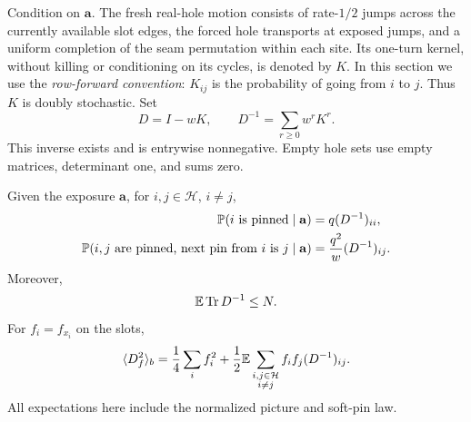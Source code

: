 Condition on $\mathbf a$.  The fresh real-hole motion consists of
rate-$1/2$ jumps across the currently available slot edges, the forced
hole transports at exposed jumps, and a uniform completion of the seam
permutation within each site.  Its one-turn kernel, without killing
or conditioning on its cycles, is denoted by $K$.  In this section we
use the \emph{row-forward convention}: $K_{ij}$ is the probability
of going from $i$ to $j$.  Thus $K$ is doubly stochastic.  Set
\begin{equation}\label{eq:hole-resolvent}
 D=I-wK,\qquad D^{-1}=\sum_{r\ge0}w^rK^r.
\end{equation}
This inverse exists and is entrywise nonnegative.  Empty hole sets use
empty matrices, determinant one, and sums zero.

\begin{lemma}\label{lem:soft-resolvent}
Given the exposure $\mathbf a$, for $i,j\in\mathcal H$, $i\ne j$,
\begin{align}
 \mathbb P(i\text{ is pinned}\mid\mathbf a)
   &=q(D^{-1})_{ii},\label{eq:pin-marginal}\\
 \mathbb P(i,j\text{ are pinned, next pin from }i\text{ is }j
            \mid\mathbf a)
   &=\frac{q^2}{w}(D^{-1})_{ij}.\label{eq:pin-successor}
\end{align}
Moreover,
\begin{equation}\label{eq:resolvent-trace}
 \mathbb E\operatorname{Tr} D^{-1}\le N.
\end{equation}
For $f_i=f_{x_i}$ on the slots,
\begin{equation}\label{eq:transverse-resolvent}
 \langle D_f^2\rangle_b
 =\frac14\sum_i f_i^2+
   \frac12\mathbb E\sum_{\substack{i,j\in\mathcal H\\i\ne j}}
                   f_if_j(D^{-1})_{ij}.
\end{equation}
All expectations here include the normalized picture and soft-pin law.
\end{lemma}

